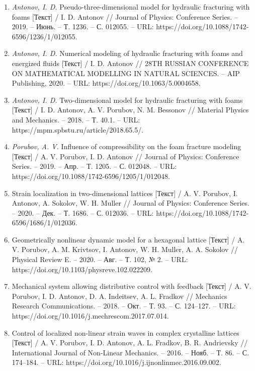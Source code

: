 \begin{enumerate}
\item \textit{Antonov, I. D.} Pseudo-three-dimensional model for hydraulic fracturing with foams [Текст] / I. D. Antonov // Journal of Physics: Conference Series. -- 2019. -- Июнь. -- Т. 1236. -- С. 012055. -- URL: https://doi.org/10.1088/1742-6596/1236/1/012055.

\item \textit{Antonov, I. D.} Numerical modeling of hydraulic fracturing with foams and energized fluids [Текст] / I. D. Antonov // 28TH RUSSIAN CONFERENCE ON MATHEMATICAL MODELLING IN NATURAL SCIENCES. -- AIP Publishing, 2020. -- URL: https://doi.org/10.1063/5.0004658.

\item \textit{Antonov, I. D.} Two-dimensional model for hydraulic fracturing with foams [Текст] / I. D. Antonov, A. V. Porubov, N. M. Bessonov // Material Physics and Mechanics. -- 2018. -- Т. 40.1. -- URL: https://mpm.spbstu.ru/article/2018.65.5/.

\item \textit{Porubov, A. V.} Influence of compressibility on the foam fracture modeling [Текст] / A. V. Porubov, I. D. Antonov // Journal of Physics: Conference Series. -- 2019. -- Апр. -- Т. 1205. -- С. 012048. -- URL: https://doi.org/10.1088/1742-6596/1205/1/012048.

\item Strain localization in two-dimensional lattices [Текст] / A. V. Porubov, I. Antonov, A. Sokolov, W. H. Muller // Journal of Physics: Conference Series. -- 2020. -- Дек. -- Т. 1686. -- С. 012036. -- URL: https://doi.org/10.1088/1742-6596/1686/1/012036.

\item Geometrically nonlinear dynamic model for a hexagonal lattice [Текст] / A. V. Porubov, A. M. Krivtsov, I. Antonov, W. H. Muller, A. A. Sokolov // Physical Review E. -- 2020. -- Авг. -- Т. 102, № 2. -- URL: https://doi.org/10.1103/physreve.102.022209.

\item Mechanical system allowing distributive control with feedback [Текст] / A. V. Porubov, I. D. Antonov, D. A. Indeitsev, A. L. Fradkov // Mechanics Research Communications. -- 2018. -- Окт. -- Т. 93. -- С. 124--127. -- URL: https://doi.org/10.1016/j.mechrescom.2017.07.014.

\item Control of localized non-linear strain waves in complex crystalline lattices [Текст] / A. V. Porubov, I. D. Antonov, A. L. Fradkov, B. R. Andrievsky // International Journal of Non-Linear Mechanics. -- 2016. -- Нояб. -- Т. 86. -- С. 174--184. -- URL: https://doi.org/10.1016/j.ijnonlinmec.2016.09.002.


\end{enumerate}
